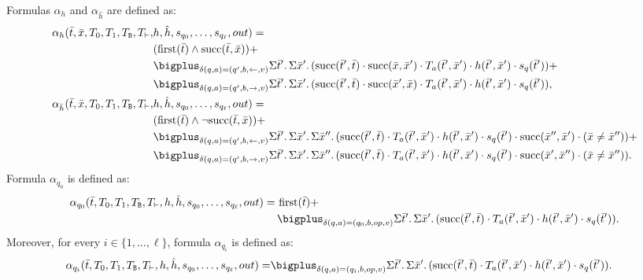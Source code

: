 Formulas $\alpha_{h}$ and $\alpha_{\hat{h}}$ are defined as:
\begin{align*}
\alpha_{h}(\bar{t},\bar{x},T_0,T_1,T_{\ttB},T_{\vdash},&h,\hat{h},s_{q_0},\ldots,s_{q_{\ell}},out) = \\
& (\first(\bar{t}) \wedge \successor(\bar{t},\bar{x})) + \\
&\bigplus_{\delta(q,a) = (q',b,\leftarrow,v)}\sa{\bar{t}'}\sa{\bar{x}'}(\successor(\bar{t}',\bar{t}) \mult \successor(\bar{x},\bar{x}')\mult T_a(\bar{t}',\bar{x}') \mult h(\bar{t}',\bar{x}') \mult s_{q}(\bar{t}')) + \\
&\bigplus_{\delta(q,a) = (q',b,\rightarrow,v)}\sa{\bar{t}'}\sa{\bar{x}'}(\successor(\bar{t}',\bar{t}) \mult \successor(\bar{x}',\bar{x})\mult T_a(\bar{t}',\bar{x}') \mult h(\bar{t}',\bar{x}') \mult s_{q}(\bar{t}')),\\
\alpha_{\hat{h}}(\bar{t},\bar{x},T_0,T_1,T_{\ttB},T_{\vdash},&h,\hat{h},s_{q_0},\ldots,s_{q_{\ell}},out) = \\
& (\first(\bar{t}) \wedge \neg\successor(\bar{t},\bar{x})) + \\
&\bigplus_{\delta(q,a) = (q',b,\leftarrow,v)}\sa{\bar{t}'}\sa{\bar{x}'}\sa{\bar{x}''}(\successor(\bar{t}',\bar{t}) \mult T_a(\bar{t}',\bar{x}')  \mult h(\bar{t}',\bar{x}') \mult s_{q}(\bar{t}') \mult \successor(\bar{x}'',\bar{x}') \mult (\bar{x} \neq \bar{x}'')) + \\
&\bigplus_{\delta(q,a) = (q',b,\rightarrow,v)}\sa{\bar{t}'}\sa{\bar{x}'}\sa{\bar{x}''}(\successor(\bar{t}',\bar{t}) \mult T_a(\bar{t}',\bar{x}')  \mult h(\bar{t}',\bar{x}') \mult s_{q}(\bar{t}') \mult \successor(\bar{x}',\bar{x}'') \mult (\bar{x} \neq \bar{x}'')).
\end{align*}
Formula $\alpha_{q_0}$ is defined as:
\begin{align*}
\alpha_{q_0}(\bar{t},T_0,T_1,T_{\ttB},T_{\vdash},h,\hat{h},s_{q_0},\ldots,s_{q_{\ell}},out) = \,& \first(\bar{t}) + \\
&\bigplus_{\delta(q,a) = (q_0,b,op,v)}\sa{\bar{t}'}\sa{\bar{x}'}(\successor(\bar{t}',\bar{t}) \mult T_a(\bar{t}',\bar{x}') \mult h(\bar{t}',\bar{x}') \mult s_{q}(\bar{t}')).
\end{align*}
Moreover, for every $i \in \{1, \ldots, \ell\}$, formula $\alpha_{q_i}$ is defined as:
\begin{align*}
\alpha_{q_i}(\bar{t},T_0,T_1,T_{\ttB},T_{\vdash},h,\hat{h},s_{q_0},\ldots,s_{q_{\ell}},out) = &\bigplus_{\delta(q,a) = (q_i,b,op,v)}\sa{\bar{t}'}\sa{\bar{x}'}(\successor(\bar{t}',\bar{t}) \mult T_a(\bar{t}',\bar{x}') \mult h(\bar{t}',\bar{x}') \mult s_{q}(\bar{t}')).
\end{align*}
